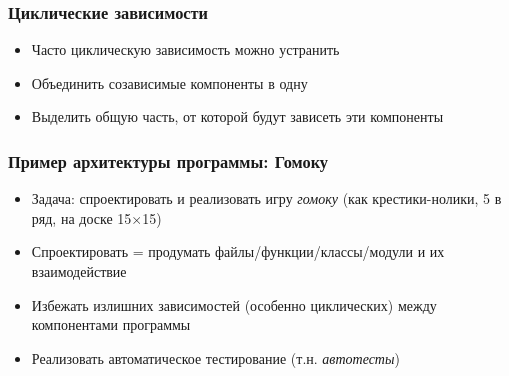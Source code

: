\documentclass[10pt]{beamer}
\begin{document}
\begin{frame}[fragile]
\frametitle{Циклические зависимости}
\begin{itemize}
\item Часто циклическую зависимость можно устранить
\pause
\item Объединить созависимые компоненты в одну

\begin{center}
\end{center}

\pause
\item Выделить общую часть, от которой будут зависеть эти компоненты

\begin{center}
\end{center}
\end{itemize}
\end{frame}

\begin{frame}[fragile]
\frametitle{Пример архитектуры программы: Гомоку}
\begin{itemize}
\item Задача: спроектировать и реализовать игру \textit{гомоку} (как крестики-нолики, 5 в ряд, на доске 15\(\times\)15)
\pause
\item Спроектировать = продумать файлы/функции/классы/модули и их взаимодействие
\pause
\item Избежать излишних зависимостей (особенно циклических) между компонентами программы
\pause
\item Реализовать автоматическое тестирование (т.н. \textit{автотесты})
\end{itemize}
\end{frame}
\end{document}
